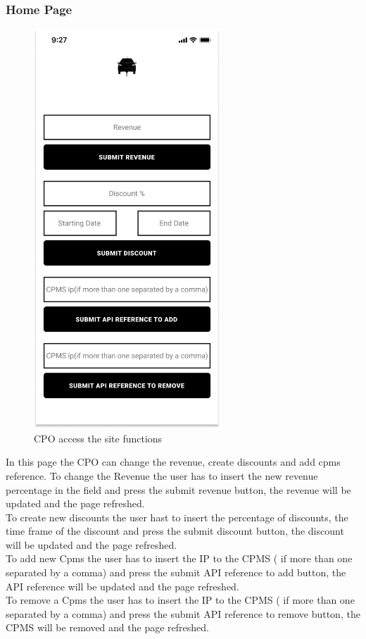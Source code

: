 \subsubsection{Home Page}
\begin{figure}[H]
    \centering
    \includegraphics[keepaspectratio, height=15cm]{Mockup/CPOAppInterface/Homepage.png}
    \caption{\ac{CPO} access the site functions}
    \label{site:Homepage}
\end{figure}
In this page the \ac{CPO} can change the revenue, create discounts and add cpms reference.
To change the Revenue the user has to insert the new revenue percentage in the field and press the submit revenue button, the revenue will be updated and the page refreshed.\\
To create new discounts the user hast to insert the percentage of discounts, the time frame of the discount and press the submit discount button, the discount will be updated and the page refreshed.\\
To add new Cpms the user has to insert the IP to the \ac{CPMS} ( if more than one separated by a comma) and press the submit \ac{API} reference to add button, the \ac{API} reference will be updated and the page refreshed.\\
To remove a Cpms the user has to insert the IP to the \ac{CPMS} ( if more than one separated by a comma) and press the submit \ac{API} reference to remove button, the \ac{CPMS} will be removed and the page refreshed.

